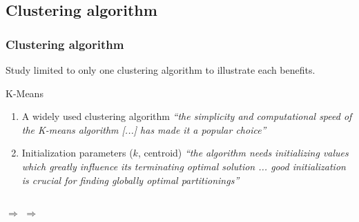 
	\subsection[Clustering]{Clustering algorithm}
		\begin{frame}
			\frametitle{Clustering algorithm}	
			\begin{center}
				\alert{Study limited to only one clustering algorithm to illustrate each benefits.}	
			\end{center}
			\begin{block}{K-Means}
				\begin{enumerate}
					\item A widely used clustering algorithm \textit{``the simplicity and computational speed of the K-means algorithm [...] has made it a popular choice''}\footnotemark[1]
					\item Initialization parameters ($k$, centroid) \textit{``the algorithm needs initializing values which greatly influence its terminating optimal solution ... good initialization is crucial for finding globally optimal partitionings''} \footnotemark[1]
				\end{enumerate}
			\end{block}
			\pause
			\begin{columns}[c]	
			\column{3em}
				\column{0.1em}
				$\Rightarrow$
				\column{8em}
				\vspace{1em}
				\column{0.1em}
				$\Rightarrow$
				\column{8em}
			\end{columns}			
		\end{frame}
				

